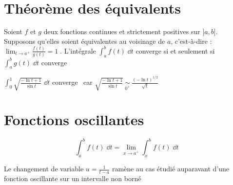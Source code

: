 \section*{Théorème des équivalents}

\begin{frame}

	
\begin{theoreme}
Soient $f$ et $g$ deux fonctions continues et strictement positives sur
$]a,b]$.  Supposons qu'elles soient équivalentes au voisinage de $a$, c'est-à-dire :
$\lim_{t\rightarrow a^+}\frac{f(t)}{g(t)} = 1\;.$
L'intégrale $\int_a^b f(t)\;\dd t$ converge si et seulement si 
$\int_a^b g(t)\;\dd t$ converge
\end{theoreme}

\pause



\begin{exemple}

$\int_0^1 \sqrt{\frac{-\ln t+1}{\sin t}}\;\dd t$ converge
\pause
\ car $\sqrt{\frac{-\ln t+1}{\sin t}} \ \underset{0^+}{\sim}\ 
\frac{(-\ln t)^{1/2}}{\sqrt{t}}$ 
\end{exemple}
\end{frame}


\begin{frame}


\end{frame}



\section*{Fonctions oscillantes}

\begin{frame}

\vspace*{-2ex}
\pause
\vspace*{-2ex}
$$\int_a^b f(t)\;\dd t = \lim_{x\rightarrow a^+} \int_x^b f(t)\;\dd t$$


\pause 

Le changement de variable $u=\frac{1}{t-a}$ ramène au cas étudié auparavant 
d'une fonction oscillante sur un intervalle non borné

\end{frame}



